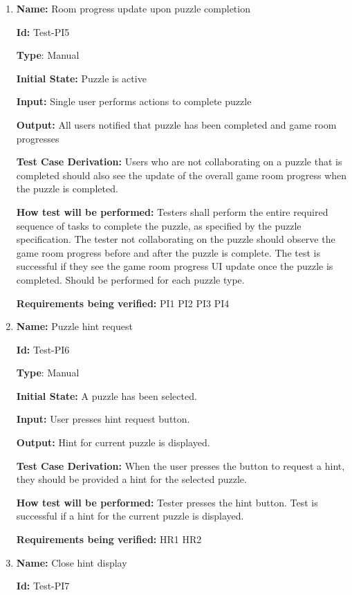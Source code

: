 \documentclass[12pt, titlepage]{article}
\begin{document}
\begin{enumerate}
\item{\textbf{Name:} Room progress update upon puzzle completion} \label{itm:Test-PI6}

\textbf{Id:} Test-PI5

\textbf{Type}: Manual

\textbf{Initial State:} Puzzle is active

\textbf{Input:} Single user performs actions to complete puzzle

\textbf{Output:} All users notified that puzzle has been completed and game room progresses

\textbf{Test Case Derivation:}
Users who are not collaborating on a puzzle that is completed should also see the update of the overall game room progress when the puzzle is completed.

\textbf{How test will be performed:}
Testers shall perform the entire required sequence of tasks to complete the puzzle, as specified by the puzzle specification. The tester not collaborating on the puzzle should observe the game room progress before and after the puzzle is complete. The test is successful if they see the game room progress UI update once the puzzle is completed. Should be performed for each puzzle type.

\textbf{Requirements being verified: } PI1 PI2 PI3 PI4

\item{\textbf{Name:} Puzzle hint request} \label{itm:Test-PI8}

\textbf{Id:} Test-PI6

\textbf{Type}: Manual

\textbf{Initial State:} A puzzle has been selected.

\textbf{Input:} User presses hint request button.

\textbf{Output:} Hint for current puzzle is displayed.

\textbf{Test Case Derivation:}
When the user presses the button to request a hint, they should be provided a hint for the selected puzzle.

\textbf{How test will be performed:}
Tester presses the hint button. Test is successful if a hint for the current puzzle is displayed.

\textbf{Requirements being verified: } HR1 HR2

\item{\textbf{Name:} Close hint display} \label{itm:Test-PI9}

\textbf{Id:} Test-PI7


\end{enumerate}
\end{document}
